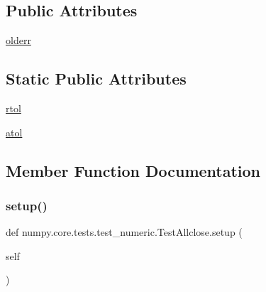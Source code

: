 \subsection*{Public Attributes}
\begin{DoxyCompactItemize}
\item 
\hyperlink{classnumpy_1_1core_1_1tests_1_1test__numeric_1_1TestAllclose_a0c7ed0288c97c49bb7ff58789a4e8c44}{olderr}
\end{DoxyCompactItemize}
\subsection*{Static Public Attributes}
\begin{DoxyCompactItemize}
\item 
\hyperlink{classnumpy_1_1core_1_1tests_1_1test__numeric_1_1TestAllclose_af8df6b930d03e99c8ffbf6850033ac8f}{rtol}
\item 
\hyperlink{classnumpy_1_1core_1_1tests_1_1test__numeric_1_1TestAllclose_a8fbbd87220ad4b0aa02eb5dc6f790c04}{atol}
\end{DoxyCompactItemize}


\subsection{Member Function Documentation}
\mbox{\label{classnumpy_1_1core_1_1tests_1_1test__numeric_1_1TestAllclose_a8c78f8d6160a96447d02fcac890f82d2}} 
\subsubsection{\texorpdfstring{setup()}{setup()}}
{\footnotesize\ttfamily def numpy.\+core.\+tests.\+test\+\_\+numeric.\+Test\+Allclose.\+setup (\begin{DoxyParamCaption}\item[{}]{self }\end{DoxyParamCaption})}

\mbox{\label{classnumpy_1_1core_1_1tests_1_1test__numeric_1_1TestAllclose_a77214152dba42bda59eb3bd5fd9747a7}} 
